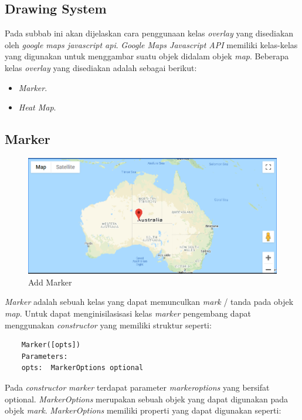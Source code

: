 \subsection{Drawing System}
Pada subbab ini akan dijelaskan cara penggunaan kelas \textit{overlay} yang disediakan oleh \textit{google maps javascript api}. \textit{Google Maps Javascript API } memiliki  kelas-kelas yang digunakan untuk menggambar suatu objek didalam objek \textit{map}. Beberapa kelas \textit{overlay} yang disediakan adalah sebagai berikut:

\begin{itemize}
    \item \textit{Marker}.
    \item \textit{Heat Map}.
\end{itemize}

\subsection{Marker}
\label{sec:mark}
  \begin{figure}[H]
    \centering
    \includegraphics[scale=0.5]{Gambar/add_marker.PNG}
    \caption{Add Marker}
    \label{fig:my_label}
\end{figure}

\textit{Marker} adalah sebuah kelas yang dapat memunculkan \textit{mark} / tanda pada objek \textit{map}. Untuk dapat menginisilasisasi kelas \textit{marker} pengembang dapat menggunakan \textit{constructor} yang memiliki struktur seperti:
\begin{lstlisting}
    Marker([opts])
    Parameters: 
    opts:  MarkerOptions optional
\end{lstlisting}
Pada \textit{constructor} \textit{marker} terdapat parameter \textit{markeroptions} yang bersifat optional. \textit{MarkerOptions} merupakan sebuah objek yang dapat digunakan pada objek \textit{mark}. \textit{MarkerOptions} memiliki properti yang dapat digunakan  seperti:

